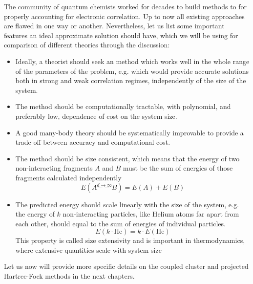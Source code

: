 The community of quantum chemists worked for decades to build methods to 
for properly accounting for electronic correlation. Up to now all existing 
approaches are flawed in one way or another. Nevertheless, let us list some 
important features an ideal approximate solution should have, which we will be 
using for comparison of different theories through the discussion:

\begin{itemize}
 \item Ideally, a theorist should seek an method which works well in the 
whole range of the parameters of the problem, e.g. which would provide accurate 
solutions both in strong and weak correlation regimes, independently of the 
size of the system. 

\item The method should be computationally tractable, with polynomial, and 
preferably low, dependence of cost on the system size.

\item A good many-body theory should be systematically improvable to provide a 
trade-off between accuracy and computational cost.

\item The method should be size consistent, which means that the energy of two 
non-interacting fragments $A$ and $B$ must be the sum of energies of those 
fragments calculated independently
\begin{equation}
 E(A \overset{d \longrightarrow \infty}{--} B) = E(A) + E(B)
\end{equation}

\item The predicted energy should scale linearly with the size of the system, 
e.g. the energy of $k$ non-interacting particles, like Helium atoms far apart 
from each other, should equal to the sum of energies of individual particles.
\begin{equation}
 E(k \cdot \mathrm{He}) = k \cdot E(\mathrm{He})
\end{equation}
This property is called size extensivity and is important in thermodynamics, 
where extensive quantities scale with system size
\end{itemize}

Let us now will provide more specific details on the coupled cluster 
and projected Hartree-Fock methods in the next chapters. 

